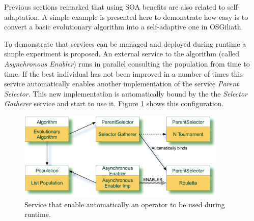Previous sections remarked that using SOA benefits are also related
to self-adaptation. A simple example is presented here to demonstrate
how easy is to convert a basic evolutionary algorithm into a
self-adaptive one in OSGiliath. 



To demonstrate that services can be managed and deployed during runtime a simple experiment is proposed. An external service to the algorithm (called {\em Asynchronous Enabler}) runs in parallel consulting the population from time to time. If the best individual has not been improved in a number of times this service automatically enables another implementation of the service {\em Parent Selector}. This new implementation is automatically bound by the the {\em Selector Gatherer} service and start to use it. Figure \ref{fig:osgiliath:enabler} shows this configuration.

\begin{figure}
\centering
\includegraphics[width=10cm]{gfx/osgiliath/enabler.jpg}
\caption{Service that enable automatically an operator to be used during runtime.}
\label{fig:osgiliath:enabler}
\end{figure}

